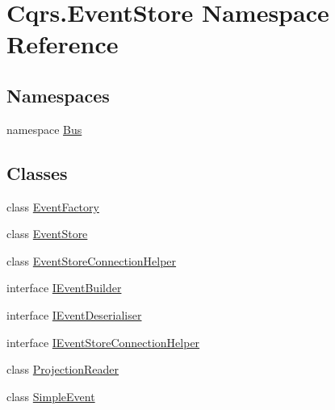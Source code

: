 \hypertarget{namespaceCqrs_1_1EventStore}{}\section{Cqrs.\+Event\+Store Namespace Reference}
\label{namespaceCqrs_1_1EventStore}
\subsection*{Namespaces}
\begin{DoxyCompactItemize}
\item 
namespace \hyperlink{namespaceCqrs_1_1EventStore_1_1Bus}{Bus}
\end{DoxyCompactItemize}
\subsection*{Classes}
\begin{DoxyCompactItemize}
\item 
class \hyperlink{classCqrs_1_1EventStore_1_1EventFactory}{Event\+Factory}
\item 
class \hyperlink{classCqrs_1_1EventStore_1_1EventStore}{Event\+Store}
\item 
class \hyperlink{classCqrs_1_1EventStore_1_1EventStoreConnectionHelper}{Event\+Store\+Connection\+Helper}
\item 
interface \hyperlink{interfaceCqrs_1_1EventStore_1_1IEventBuilder}{I\+Event\+Builder}
\item 
interface \hyperlink{interfaceCqrs_1_1EventStore_1_1IEventDeserialiser}{I\+Event\+Deserialiser}
\item 
interface \hyperlink{interfaceCqrs_1_1EventStore_1_1IEventStoreConnectionHelper}{I\+Event\+Store\+Connection\+Helper}
\item 
class \hyperlink{classCqrs_1_1EventStore_1_1ProjectionReader}{Projection\+Reader}
\item 
class \hyperlink{classCqrs_1_1EventStore_1_1SimpleEvent}{Simple\+Event}
\end{DoxyCompactItemize}
